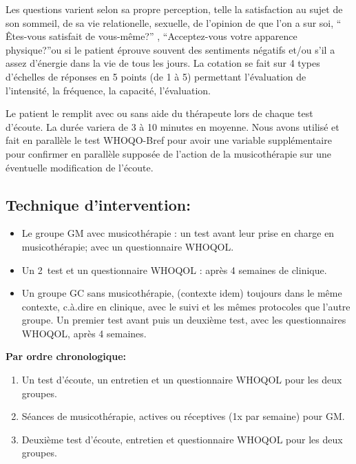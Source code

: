 	

Les questions varient selon sa propre perception, telle la satisfaction
au sujet de son  sommeil, de sa vie relationelle, sexuelle, de
l'opinion de que l'on a sur soi,  `` Êtes-vous satisfait de
vous-même?'' , ``Acceptez-vous votre apparence physique?''ou si le patient éprouve souvent des sentiments négatifs
et/ou s'il a assez d'énergie dans la vie de tous les jours.
La cotation se fait sur 4 types d'échelles de réponses en 5 points (de 1 à 5)
permettant l'évaluation de l'intensité, la fréquence, la capacité, l'évaluation.

Le patient le remplit avec ou sans aide du
thérapeute lors de chaque test
d'écoute. La durée variera de 3 à 10 minutes en
moyenne. 
Nous avons utilisé et fait en parallèle le test WHOQO-Bref pour avoir une variable supplémentaire pour confirmer en
parallèle supposée de l'action de la musicothérapie sur une éventuelle modification de l'écoute.


        	
 \subsection{Technique d'intervention:}


       
\begin{itemize}
\item Le groupe GM avec musicothérapie : un
          test avant leur prise en charge en musicothérapie; avec un questionnaire
          WHOQOL.
          
\item Un 2\ieme\ test et un questionnaire WHOQOL : après 4 semaines de
          clinique.
          
\item Un groupe GC sans musicothérapie, (contexte idem)
	toujours dans le même contexte, c.à.dire en clinique, avec le suivi et les mêmes protocoles que l'autre groupe. Un premier test avant
        puis un deuxième test, avec les questionnaires WHOQOL, après 4 semaines.
        
\end{itemize}

\textbf{ Par ordre chronologique:}
 
\begin{enumerate} 
   \item Un test d'écoute, un entretien et un questionnaire
        WHOQOL pour les deux groupes.
    \item Séances de musicothérapie, actives ou réceptives (1x par
        semaine) pour GM.
    \item Deuxième test d'écoute, entretien et questionnaire
      WHOQOL pour les deux groupes.
      
\end{enumerate}

